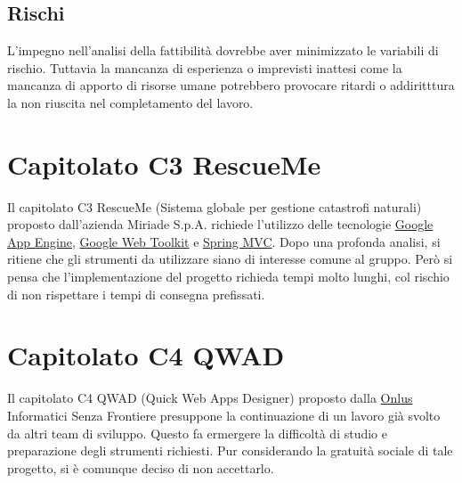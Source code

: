 \section{Rischi}
L'impegno nell'analisi della fattibilit\`a dovrebbe aver minimizzato le variabili di rischio.
Tuttavia la mancanza di esperienza o imprevisti inattesi come la mancanza di apporto di risorse umane potrebbero provocare ritardi o addiritttura la non riuscita nel completamento del lavoro.

\chapter{Capitolato C3 RescueMe}
Il capitolato C3 RescueMe (Sistema globale per gestione catastrofi naturali)
proposto dall'azienda Miriade S.p.A. richiede l'utilizzo delle tecnologie
\underline{Google App Engine}, \underline{Google Web Toolkit} e
\underline{Spring MVC}. Dopo una profonda analisi, si ritiene che gli strumenti
da utilizzare siano di interesse comune al gruppo. Per\`o si pensa che l'implementazione del progetto richieda tempi molto lunghi, col rischio di non rispettare i tempi di consegna prefissati.

\chapter{Capitolato C4 QWAD}
Il capitolato C4 QWAD (Quick Web Apps Designer) proposto dalla \underline{Onlus}
Informatici Senza Frontiere presuppone la continuazione di un lavoro gi\`a svolto da altri
team di sviluppo. Questo fa ermergere la difficolt\`a di studio e preparazione degli strumenti richiesti. Pur considerando la gratuit\`a sociale di tale progetto, si \`e comunque deciso di non accettarlo.

